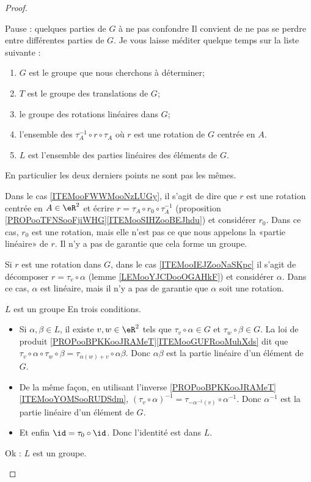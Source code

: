 \begin{proof}
	\begin{subproof}
		\item[Pause : quelques parties de \( G\) à ne pas confondre]
		Il convient de ne pas se perdre entre différentes parties de \( G\). Je vous laisse méditer quelque temps sur la liste suivante :
		\begin{enumerate}
			\item \( G\) est le groupe que nous cherchons à déterminer;
			\item \( T\) est le groupe des translations de \( G\);
			\item le groupe des rotations linéaires dans \( G\);
			\item l'ensemble des \( \tau_A^{-1}\circ r\circ\tau_A\) où \( r\) est une rotation de \( G\) centrée en \( A\).     \label{ITEMooFWWMooNzLUGy}
			\item \( L\) est l'ensemble des parties linéaires des éléments de \( G\).      \label{ITEMooIEJZooNaSKpc}
		\end{enumerate}
		En particulier les deux derniers points ne sont pas les mêmes.

		Dans le cas \ref{ITEMooFWWMooNzLUGy}, il s'agit de dire que \( r\) est une rotation centrée en \( A\in \eR^2\) et écrire \( r=\tau_A\circ r_0\circ \tau_A^{-1}\) (proposition \ref{PROPooTFNSooFjiWHG}\ref{ITEMooSIHZooBEJhdu}) et considérer \( r_0\). Dans ce cas, \( r_0\) est une rotation, mais elle n'est pas ce que nous appelons la «partie linéaire» de \( r\). Il n'y a pas de garantie que cela forme un groupe.

		Si \( r\) est une rotation dans \( G\), dans le cas \ref{ITEMooIEJZooNaSKpc} il s'agit de décomposer \( r=\tau_v\circ\alpha\) (lemme \ref{LEMooYJCDooOGAHkF}) et considérer \( \alpha\). Dans ce cas, \( \alpha\) est linéaire, mais il n'y a pas de garantie que \( \alpha\) soit une rotation.

		\item[\( L\) est un groupe]
		En trois conditions.
		\begin{itemize}
			\item
			      Si \( \alpha,\beta\in L\), il existe \( v,w\in \eR^2\) tels que \( \tau_v\circ \alpha\in G\) et \( \tau_w\circ \beta\in G\). La loi de produit \ref{PROPooBPKKooJRAMeT}\ref{ITEMooGUFRooMuhXds} dit que \( \tau_v\circ \alpha\circ\tau_w\circ \beta=\tau_{\alpha(w)+v}\circ \alpha\beta\). Donc \( \alpha\beta\) est la partie linéaire d'un élément de \( G\).
			\item
			      De la même façon, en utilisant l'inverse \ref{PROPooBPKKooJRAMeT}\ref{ITEMooYOMSooRUDSdm}, \( (\tau_v\circ\alpha)^{-1}= \tau_{-\alpha^{-1}(v)}\circ \alpha^{-1}   \). Donc \( \alpha^{-1}\) est la partie linéaire d'un élément de \( G\).
			\item
			      Et enfin \( \id=\tau_0\circ \id\). Donc l'identité est dans \( L\).
		\end{itemize}
		Ok : \( L\) est un groupe.


\end{subproof}
\end{proof}
